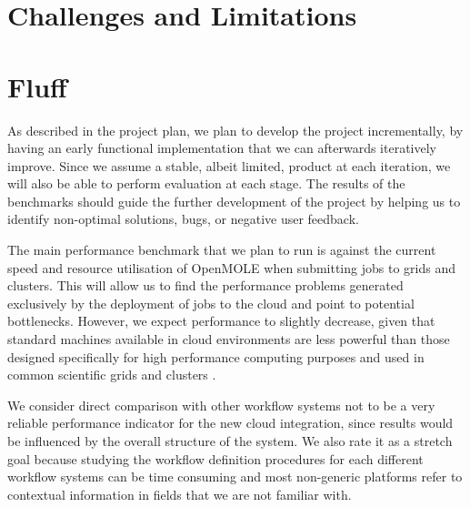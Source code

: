 \section{Challenges and Limitations}






\section{Fluff}

As described in the project plan, we plan to develop the project incrementally, by having an early functional implementation that we can afterwards iteratively improve. Since we assume a stable, albeit limited, product at each iteration, we will also be able to perform evaluation at each stage. The results of the benchmarks should guide the further development of the project by helping us to identify non-optimal solutions, bugs, or negative user feedback.

The main performance benchmark that we plan to run is against the current speed and resource utilisation of OpenMOLE when submitting jobs to grids and clusters. This will allow us to find the performance problems generated exclusively by the deployment of jobs to the cloud and point to potential bottlenecks. However, we expect performance to slightly decrease, given that standard machines available in cloud environments are less powerful than those designed specifically for high performance computing purposes and used in common scientific grids and clusters \cite{Juve2009}.

We consider direct comparison with other workflow systems not to be a very reliable performance indicator for the new cloud integration, since results would be influenced by the overall structure of the system. We also rate it as a stretch goal because studying the workflow definition procedures for each different workflow systems can be time consuming and most non-generic platforms refer to contextual information in fields that we are not familiar with.

